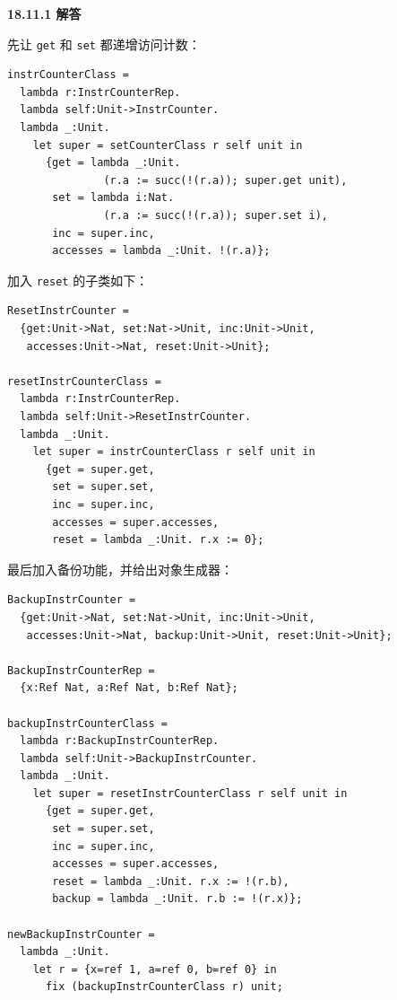 \begin{taplauthorsolutionentrybox}
\label{sol:author:18.11.1}
\textbf{18.11.1 解答}

先让 \texttt{get} 和 \texttt{set} 都递增访问计数：

\begin{lstlisting}
instrCounterClass =
  lambda r:InstrCounterRep.
  lambda self:Unit->InstrCounter.
  lambda _:Unit.
    let super = setCounterClass r self unit in
      {get = lambda _:Unit.
               (r.a := succ(!(r.a)); super.get unit),
       set = lambda i:Nat.
               (r.a := succ(!(r.a)); super.set i),
       inc = super.inc,
       accesses = lambda _:Unit. !(r.a)};
\end{lstlisting}

加入 \texttt{reset} 的子类如下：

\begin{lstlisting}
ResetInstrCounter =
  {get:Unit->Nat, set:Nat->Unit, inc:Unit->Unit,
   accesses:Unit->Nat, reset:Unit->Unit};

resetInstrCounterClass =
  lambda r:InstrCounterRep.
  lambda self:Unit->ResetInstrCounter.
  lambda _:Unit.
    let super = instrCounterClass r self unit in
      {get = super.get,
       set = super.set,
       inc = super.inc,
       accesses = super.accesses,
       reset = lambda _:Unit. r.x := 0};
\end{lstlisting}

最后加入备份功能，并给出对象生成器：

\begin{lstlisting}
BackupInstrCounter =
  {get:Unit->Nat, set:Nat->Unit, inc:Unit->Unit,
   accesses:Unit->Nat, backup:Unit->Unit, reset:Unit->Unit};

BackupInstrCounterRep =
  {x:Ref Nat, a:Ref Nat, b:Ref Nat};

backupInstrCounterClass =
  lambda r:BackupInstrCounterRep.
  lambda self:Unit->BackupInstrCounter.
  lambda _:Unit.
    let super = resetInstrCounterClass r self unit in
      {get = super.get,
       set = super.set,
       inc = super.inc,
       accesses = super.accesses,
       reset = lambda _:Unit. r.x := !(r.b),
       backup = lambda _:Unit. r.b := !(r.x)};

newBackupInstrCounter =
  lambda _:Unit.
    let r = {x=ref 1, a=ref 0, b=ref 0} in
      fix (backupInstrCounterClass r) unit;
\end{lstlisting}

\end{taplauthorsolutionentrybox}

